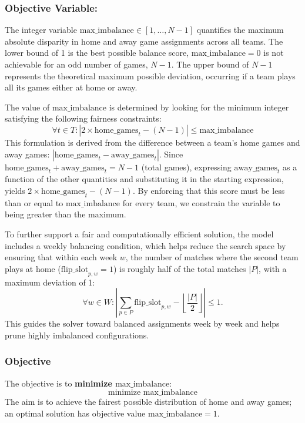 \subsubsection{Objective Variable: }\label{objective}
The integer variable $\text{max\_imbalance} \in [1, \dots, N-1]$ quantifies the maximum absolute disparity in home and away game assignments across all teams. The lower bound of 1 is the best possible balance score, $\text{max\_imbalance}=0$ is not achievable for an odd number of games, $N-1$. The upper bound of $N-1$ represents the theoretical maximum possible deviation, occurring if a team plays all its games either at home or away.

The value of $\text{max\_imbalance}$ is determined by looking for the minimum integer satisfying the following fairness constraints:
\[ \forall t \in T : \left| 2 \times \text{home\_games}_{t} - (N-1) \right| \leq \text{max\_imbalance} \]
This formulation is derived from the difference between a team's home games and away games: $|\text{home\_games}_t - \text{away\_games}_t|$. Since \\ $\text{home\_games}_{t} + \text{away\_games}_{t} = N-1$ (total games), expressing $\text{away\_games}_t$ as a function of the other quantities and substituting it in the starting expression, yields $2 \times \text{home\_games}_{t} - (N-1)$. By enforcing that this score must be less than or equal to $\text{max\_imbalance}$ for every team, we constrain the variable to being greater than the maximum.

To further support a fair and computationally efficient solution, the model includes a weekly balancing condition, which helps reduce the search space by ensuring that within each week $w$, the number of matches where the second team plays at home ($\text{flip\_slot}_{p, w} = 1$) is roughly half of the total matches $|P|$, with a maximum deviation of 1:
\[
\forall w \in W : \left| \sum_{p \in P} \text{flip\_slot}_{p, w} - \left\lfloor \frac{|P|}{2} \right\rfloor \right| \leq 1.
\]
This guides the solver toward balanced assignments week by week and helps prune highly imbalanced configurations.

\subsubsection{Objective}
The objective is to \textbf{minimize $\text{max\_imbalance}$}:
\[ \text{minimize } \text{max\_imbalance} \]
The aim is to achieve the fairest possible distribution of home and away games; an optimal solution has objective value $\text{max\_imbalance}=1$.

